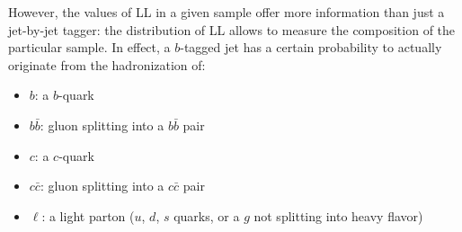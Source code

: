 However, the values of LL in a given sample offer more information than just a jet-by-jet tagger: the distribution of LL allows to measure the composition of the particular sample. In effect, a $b$-tagged jet has a certain probability to actually originate from the hadronization of:

\begin{itemize}
\item
$b$: a $b$-quark
\item
$b\bar{b}$: gluon splitting into a $b\bar{b}$ pair
\item
$c$: a $c$-quark
\item
$c\bar{c}$: gluon splitting into a $c\bar{c}$ pair
\item
$\ell$: a light parton ($u$, $d$, $s$ quarks, or a $g$ not splitting into heavy flavor)
\end{itemize}

